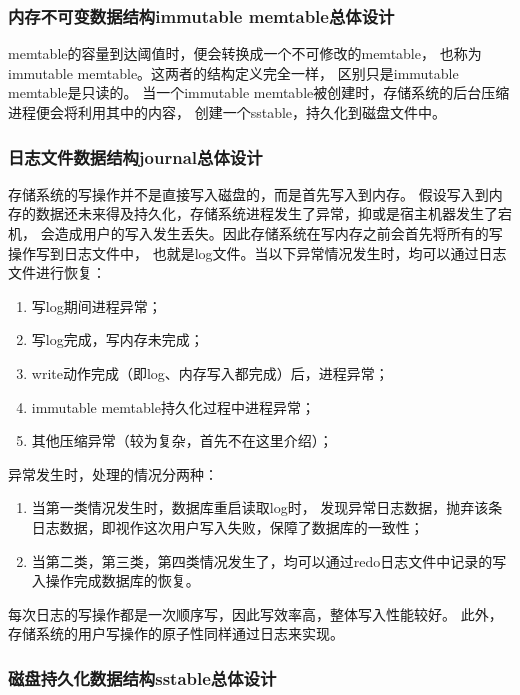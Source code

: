 		\subsubsection{内存不可变数据结构immutable memtable总体设计}

		memtable的容量到达阈值时，便会转换成一个不可修改的memtable，
		也称为immutable memtable。这两者的结构定义完全一样，
		区别只是immutable memtable是只读的。
		当一个immutable memtable被创建时，存储系统的后台压缩进程便会将利用其中的内容，
		创建一个sstable，持久化到磁盘文件中。

		\subsubsection{日志文件数据结构journal总体设计}

		存储系统的写操作并不是直接写入磁盘的，而是首先写入到内存。
		假设写入到内存的数据还未来得及持久化，存储系统进程发生了异常，抑或是宿主机器发生了宕机，
		会造成用户的写入发生丢失。因此存储系统在写内存之前会首先将所有的写操作写到日志文件中，
		也就是log文件。当以下异常情况发生时，均可以通过日志文件进行恢复：

		\begin{enumerate}
			\item 写log期间进程异常；
			\item 写log完成，写内存未完成；
			\item write动作完成（即log、内存写入都完成）后，进程异常；
			\item immutable memtable持久化过程中进程异常；
			\item 其他压缩异常（较为复杂，首先不在这里介绍）；
		\end{enumerate}
	
	异常发生时，处理的情况分两种：
		\begin{enumerate}
			\item 当第一类情况发生时，数据库重启读取log时，
			发现异常日志数据，抛弃该条日志数据，即视作这次用户写入失败，保障了数据库的一致性；
			\item 当第二类，第三类，第四类情况发生了，均可以通过redo日志文件中记录的写入操作完成数据库的恢复。
		\end{enumerate}
		每次日志的写操作都是一次顺序写，因此写效率高，整体写入性能较好。
		此外，存储系统的用户写操作的原子性同样通过日志来实现。

		\subsubsection{磁盘持久化数据结构sstable总体设计}

